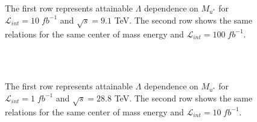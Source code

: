 \documentclass{appolb}
\begin{document}
\begin{figure}[h!]
	\centering
	\scalebox{0.31}{}
	\scalebox{0.31}{}\\	
	\scalebox{0.31}{}
	\scalebox{0.31}{}\\

	\caption{\label{fig:LamdaMass} The first row represents  attainable $\Lambda$ dependence on  $M_{u^*}$ for $\mathcal{L}_{int} = 10\; fb^{-1}$ and  $\sqrt{s} = 9.1$ TeV.  The second row shows the same relations for the same center of mass energy and  $\mathcal{L}_{int} = 100\; fb^{-1}$.}
\end{figure}
\begin{figure}[h!]
	\centering
	\scalebox{0.31}{}
		\scalebox{0.31}{}\\
	\scalebox{0.31}{}
	\scalebox{0.31}{}\\
	\caption{\label{fig:LamdaMass2} The first row represents  attainable $\Lambda$ dependence on  $M_{u^*}$ for $\mathcal{L}_{int} = 1\; fb^{-1}$ and  $\sqrt{s} = 28.8$ TeV.  The second row shows the same relations for the same center of mass energy and  $\mathcal{L}_{int} = 10\; fb^{-1}$.}
\end{figure}
\end{document}
